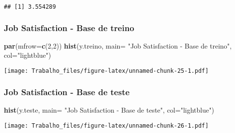 \documentclass[]{article}
\newenvironment{Shaded}{\begin{snugshade}}{\end{snugshade}}
\newcommand{\KeywordTok}[1]{\textcolor[rgb]{0.13,0.29,0.53}{\textbf{#1}}}
\newcommand{\DataTypeTok}[1]{\textcolor[rgb]{0.13,0.29,0.53}{#1}}
\newcommand{\DecValTok}[1]{\textcolor[rgb]{0.00,0.00,0.81}{#1}}
\newcommand{\StringTok}[1]{\textcolor[rgb]{0.31,0.60,0.02}{#1}}
\newcommand{\OperatorTok}[1]{\textcolor[rgb]{0.81,0.36,0.00}{\textbf{#1}}}
\newcommand{\NormalTok}[1]{#1}
\begin{document}
\begin{Shaded}
\end{Shaded}

\begin{verbatim}
## [1] 3.554289
\end{verbatim}

\subsubsection{Job Satisfaction - Base de
treino}\label{job-satisfaction---base-de-treino-1}

\begin{Shaded}
\begin{Highlighting}[]
\KeywordTok{par}\NormalTok{(}\DataTypeTok{mfrow=}\KeywordTok{c}\NormalTok{(}\DecValTok{2}\NormalTok{,}\DecValTok{2}\NormalTok{))}
\KeywordTok{hist}\NormalTok{(y.treino, }\DataTypeTok{main=} \StringTok{"Job Satisfaction - Base de treino"}\NormalTok{, }\DataTypeTok{col=}\StringTok{"lightblue"}\NormalTok{)}
\end{Highlighting}
\end{Shaded}

\texttt{[image: Trabalho\_files/figure-latex/unnamed-chunk-25-1.pdf]}

\subsubsection{Job Satisfaction - Base de
teste}\label{job-satisfaction---base-de-teste-1}

\begin{Shaded}
\begin{Highlighting}[]
\KeywordTok{hist}\NormalTok{(y.teste, }\DataTypeTok{main=} \StringTok{"Job Satisfaction - Base de teste"}\NormalTok{, }\DataTypeTok{col=}\StringTok{"lightblue"}\NormalTok{)}
\end{Highlighting}
\end{Shaded}

\texttt{[image: Trabalho\_files/figure-latex/unnamed-chunk-26-1.pdf]}
\end{document}
